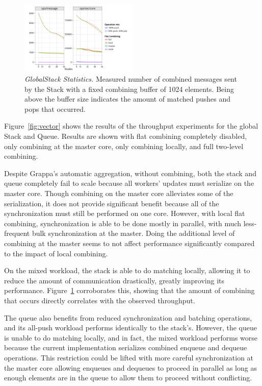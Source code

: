 \begin{figure}[t]
  \centering
  \includegraphics[width=0.5\textwidth]{data/plots/stack_stats.pdf}
  \caption{\emph{GlobalStack Statistics.}
    Measured number of combined messages sent by the Stack with a fixed combining buffer of 1024 elements. Being above the buffer size indicates the amount of matched pushes and pops that occurred.
  }
  \label{fig:stack_stats}
\end{figure}

Figure~\ref{fig:vector} shows the results of the throughput experiments for the global Stack and Queue. Results are shown with flat combining completely disabled, only combining at the master core, only combining locally, and full two-level combining.

Despite Grappa's automatic aggregation, without combining, both the stack and queue completely fail to scale because all workers' updates must serialize on the master core.
Though combining on the master core alleviates some of the serialization, it does not provide significant benefit because all of the synchronization must still be performed on one core. However, with local flat combining, synchronization is able to be done mostly in parallel, with much less-frequent bulk synchronization at the master. Doing the additional level of combining at the master seems to not affect performance significantly compared to the impact of local combining.

On the mixed workload, the stack is able to do matching locally, allowing it to reduce the amount of communication drastically, greatly improving its performance. Figure~\ref{fig:stack_stats} corroborates this, showing that the amount of combining that occurs directly correlates with the observed throughput.

The queue also benefits from reduced synchronization and batching operations, and its all-push workload performs identically to the stack's.
However, the queue is unable to do matching locally, and in fact, the mixed workload performs worse because the current implementation serializes combined enqueue and dequeue operations. This restriction could be lifted with more careful synchronization at the master core allowing enqueues and dequeues to proceed in parallel as long as enough elements are in the queue to allow them to proceed without conflicting.

